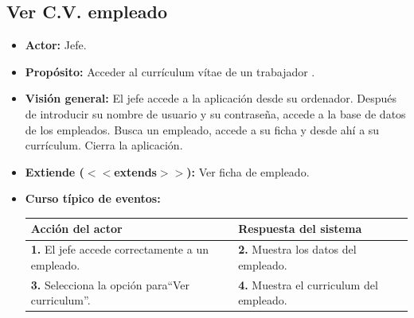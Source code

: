 \documentclass[spanish,a4paper,11pt, twoside]{report}	%
\begin{document}
	\subsection{Ver C.V. empleado}		
			\begin{itemize}
			\item \textbf{Actor:} Jefe.
			\item \textbf{Propósito:} Acceder al currículum vítae de un trabajador  .
			\item \textbf{Visión general:} El jefe accede a la aplicación desde su
				ordenador. Después de introducir su nombre de usuario y su contraseña, accede a
				la base de datos de los empleados. Busca un empleado, accede a su ficha y desde
				ahí a su currículum. Cierra la aplicación.
			\item \textbf{Extiende ($<<$extends$>>$):} Ver ficha de empleado.
			\item \textbf{Curso típico de eventos:} 	\\
				\begin{tabular}{|p{6cm}||p{6cm}|}
				\hline
				\textbf{Acción del actor} & \textbf{Respuesta del sistema} \\ \hline \hline
				\textbf{1.} El jefe accede correctamente a un empleado. & 
				\textbf{2.} Muestra los datos del empleado.\\ \hline
				\textbf{3.} Selecciona la opción para``Ver curriculum''.	& 
				\textbf{4.} Muestra el curriculum del empleado. \\ \hline
			\end{tabular}
		\end{itemize}



\end{document}
